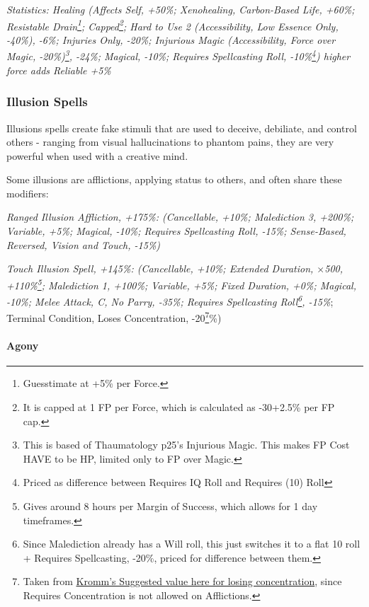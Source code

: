 \begin{multicols}{3}
	\textcolor{OliveGreen}{\textit{Statistics: Healing (Affects Self, +50\%; Xenohealing, Carbon-Based Life, +60\%; Resistable Drain\footnote{Guesstimate at +5\% per Force.}; Capped\footnote{It is capped at 1 FP per Force, which is calculated as -30+2.5\% per FP cap.}; Hard to Use 2 (Accessibility, Low Essence Only, -40\%), -6\%; Injuries Only, -20\%; Injurious Magic (Accessibility, Force over Magic, -20\%)\footnote{This is based of Thaumatology p25's Injurious Magic. This makes FP Cost HAVE to be HP, limited only to FP over Magic.}, -24\%; Magical, -10\%; Requires Spellcasting Roll, -10\%\footnote{Priced as difference between Requires IQ Roll and Requires (10) Roll}) higher force adds Reliable +5\%}}
	
	\subsubsection{Illusion Spells}
	
	Illusions spells create fake stimuli that are used to deceive, debiliate, and control others - ranging from visual hallucinations to phantom pains, they are very powerful when used with a creative mind.
	
	Some illusions are afflictions, applying status to others, and often share these modifiers:
	
	\textcolor{OliveGreen}{\textit{Ranged Illusion Affliction, +175\%: (Cancellable, +10\%; Malediction 3, +200\%; Variable, +5\%; Magical, -10\%; Requires Spellcasting Roll, -15\%; Sense-Based, Reversed, Vision and Touch, -15\%) }}
	
	\textcolor{OliveGreen}{\textit{Touch Illusion Spell, +145\%: (Cancellable, +10\%; Extended Duration, \(\times\)500, +110\%\footnote{Gives around 8 hours per Margin of Success, which allows for 1 day timeframes.}; Malediction 1, +100\%; Variable, +5\%; Fixed Duration, +0\%; Magical, -10\%; Melee Attack, C, No Parry, -35\%; Requires Spellcasting Roll\footnote{Since Malediction already has a Will roll, this just switches it to a flat 10 roll + Requires Spellcasting, -20\%, priced for difference between them.}, -15\%}; Terminal Condition, Loses Concentration, -20\footnote{Taken from \textcolor{Blue}{\href{http://forums.sjgames.com/showpost.php?p=817197&postcount=7}{Kromm's Suggested value here for losing concentration}}, since Requires Concentration is not allowed on Afflictions.}\%)}
	
	\paragraph{Agony}
	

\end{multicols}
